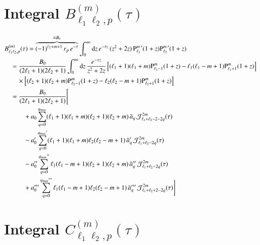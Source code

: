 \section{Integral $B_{\ell_1\ell_2,p}^{(m)}(\tau)$}

\begin{align}
\nonumber
&B_{\ell_1\ell_2,p}^{(m)}(\tau) = \overbrace{(-1)^{\ell_2+m+1} \, r_p \, e^{-\tau}}^{\equiv B_0} \int_0^\infty \mathrm{d}z \, e^{-\tau z} \, (z^2+2z) \, {\text{P}_{\ell_1}^{m}}^\prime(1+z) {\text{P}_{\ell_2}^{m}}^\prime(1+z) \\
\nonumber
&\quad = \frac{B_0}{(2\ell_1+1)(2\ell_2+1)} \int_0^\infty \mathrm{d}z \, \frac{e^{-\tau z}}{z^2+2z} \left[ (\ell_1+1)(\ell_1+m){\text{P}_{\ell_1-1}^{m}}(1+z) - \ell_1(\ell_1-m+1){\text{P}_{\ell_1+1}^{m}}(1+z) \right] \\
\nonumber
& \quad\quad \times \left[ (\ell_2+1)(\ell_2+m){\text{P}_{\ell_2-1}^{m}}(1+z) - \ell_2(\ell_2-m+1){\text{P}_{\ell_2+1}^{m}}(1+z) \right] \\
\nonumber
&\quad = \frac{B_0}{(2\ell_1+1)(2\ell_2+1)} \Bigg[ \\
\nonumber
   &\quad\quad\quad +a_0                      \sum_{q=0}^{q_\text{max}}                        (\ell_1+1)(\ell_1+m)(\ell_2+1)(\ell_2+m) \, \tilde a_q \, \mathcal{J}_{\ell_1+\ell_2-2-2q}^{2m}(\tau) \\
\nonumber
   &\quad\quad\quad -a_0^\prime               \sum_{q=0}^{{q_\text{max}}^\prime}               (\ell_1+1)(\ell_1+m)\ell_2(\ell_2-m+1)   \, \tilde a_q^\prime \, \mathcal{J}_{\ell_1+\ell_2-2q}^{2m}(\tau) \\
\nonumber
   &\quad\quad\quad -a_0^{\prime\prime}       \sum_{q=0}^{{q_\text{max}}^{\prime\prime}}       \ell_1(\ell_1-m+1)(\ell_2+1)(\ell_2+m)   \, \tilde a_q^{\prime\prime} \, \mathcal{J}_{\ell_1+\ell_2-2q}^{2m}(\tau) \\
   &\quad\quad\quad +a_0^{\prime\prime\prime} \sum_{q=0}^{{q_\text{max}}^{\prime\prime\prime}} \ell_1(\ell_1-m+1)\ell_2(\ell_2-m+1)     \, \tilde a_q^{\prime\prime\prime} \, \mathcal{J}_{\ell_1+\ell_2+2-2q}^{2m}(\tau) \Bigg]
\end{align}


\section{Integral $C_{\ell_1\ell_2,p}^{(m)}(\tau)$}

